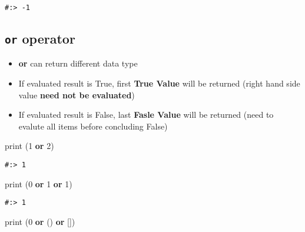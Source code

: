 \documentclass[
]{book}
\newenvironment{Shaded}{\begin{snugshade}}{\end{snugshade}}
\newcommand{\BuiltInTok}[1]{#1}
\newcommand{\DecValTok}[1]{\textcolor[rgb]{0.06,0.06,0.06}{#1}}
\newcommand{\KeywordTok}[1]{\textcolor[rgb]{0.27,0.27,0.27}{\textbf{#1}}}
\newcommand{\NormalTok}[1]{#1}
\providecommand{\tightlist}{%
  \setlength{\itemsep}{0pt}\setlength{\parskip}{0pt}}
\begin{document}
\begin{verbatim}
#:> -1
\end{verbatim}

\hypertarget{or-operator}{%
\subsection{\texorpdfstring{\texttt{or} operator}{or operator}}\label{or-operator}}

\begin{itemize}
\tightlist
\item
  \textbf{or} can return different data type\\
\item
  If evaluated result is True, first \textbf{True Value} will be returned (right hand side value \textbf{need not be evaluated})\\
\item
  If evaluated result is False, last \textbf{Fasle Value} will be returned (need to evalute all items before concluding False)
\end{itemize}

\begin{Shaded}
\begin{Highlighting}[]
\BuiltInTok{print}\NormalTok{ (}\DecValTok{1} \KeywordTok{or} \DecValTok{2}\NormalTok{)}
\end{Highlighting}
\end{Shaded}

\begin{verbatim}
#:> 1
\end{verbatim}

\begin{Shaded}
\begin{Highlighting}[]
\BuiltInTok{print}\NormalTok{ (}\DecValTok{0} \KeywordTok{or} \DecValTok{1} \KeywordTok{or} \DecValTok{1}\NormalTok{)}
\end{Highlighting}
\end{Shaded}

\begin{verbatim}
#:> 1
\end{verbatim}

\begin{Shaded}
\begin{Highlighting}[]
\BuiltInTok{print}\NormalTok{ (}\DecValTok{0} \KeywordTok{or}\NormalTok{ () }\KeywordTok{or}\NormalTok{ [])}
\end{Highlighting}
\end{Shaded}
\end{document}
